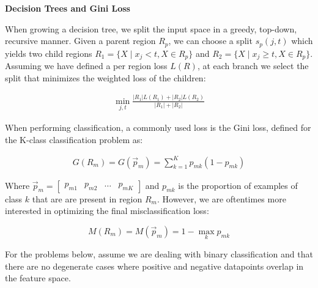 \item {} {\bf Decision Trees and Gini Loss}

When growing a decision tree, we split the input space in a greedy, top-down, recursive manner.  Given a parent region $R_p$, we can choose a split $s_p(j, t)$ which yields two child regions $R_1 = \{X \mid x_j < t, X \in R_p\}$ and $R_2 = \{X \mid x_j \geq t, X\in R_p\}$.  Assuming we have defined a per region loss $L(R)$, at each branch we select the split that minimizes the weighted loss of the children:

\begin{align*}
    \min_{j,t} \frac{\lvert R_1 \rvert L(R_1) + \lvert R_2 \rvert L(R_2)}{\lvert R_1 \rvert + \lvert R_2 \rvert}
\end{align*}

When performing classification, a commonly used loss is the Gini loss, defined for the K-class classification problem as:

\begin{align*}
    G(R_m) = G(\vec{p}_m) = \sum_{k=1}^K p_{mk} (1 - p_{mk})
\end{align*}

Where $\vec{p}_m = \begin{bmatrix}p_{m1} & p_{m2} & \dots & p_{mK}\end{bmatrix}$ and $p_{mk}$ is the proportion of examples of class $k$ that are are present in region $R_m$.  However, we are oftentimes more interested in optimizing the final misclassification loss:

\begin{equation}
    \label{misclassificationloss}
    M(R_m) = M(\vec{p}_m) = 1 - \max_k p_{mk} 
\end{equation}

For the problems below, assume we are dealing with binary classification and that there are no degenerate cases where positive and negative datapoints overlap in the feature space.

\begin{enumerate}
    
    
	\ifnum{} {
	
        } \fi
        
    
    
	\ifnum{} {
	
        } \fi
        
    
    
	\ifnum{} {
	
        } \fi
        
    
    
	\ifnum{} {
	
        } \fi
        
\end{enumerate}
